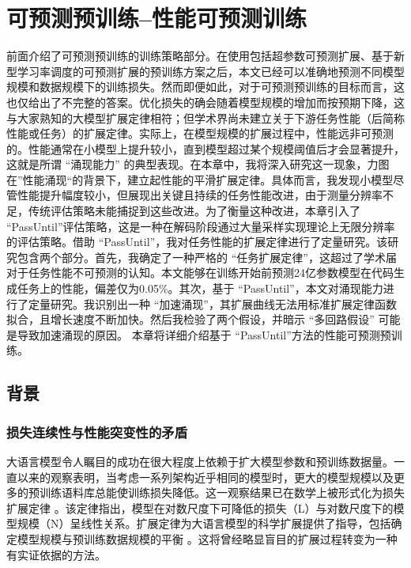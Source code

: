 


\chapter{可预测预训练--性能可预测训练}

前面介绍了可预测预训练的训练策略部分。在使用包括超参数可预测扩展、基于新型学习率调度的可预测扩展的预训练方案之后，本文已经可以准确地预测不同模型规模和数据规模下的训练损失。然而即便如此，对于可预测预训练的目标而言，这也仅给出了不完整的答案。优化损失的确会随着模型规模的增加而按预期下降，这与大家熟知的大模型扩展定律相符；但学术界尚未建立关于下游任务性能（后简称性能或任务）的扩展定律。实际上，在模型规模的扩展过程中，性能远非可预测的。性能通常在小模型上提升较小，直到模型超过某个规模阈值后才会显著提升，这就是所谓 “涌现能力” 的典型表现。在本章中，我将深入研究这一现象，力图在”性能涌现“的背景下，建立起性能的平滑扩展定律。具体而言，我发现小模型尽管性能提升幅度较小，但展现出关键且持续的任务性能改进，由于测量分辨率不足，传统评估策略未能捕捉到这些改进。为了衡量这种改进，本章引入了 “PassUntil”评估策略，这是一种在解码阶段通过大量采样实现理论上无限分辨率的评估策略。借助 “PassUntil”，我对任务性能的扩展定律进行了定量研究。该研究包含两个部分。首先，我确定了一种严格的 “任务扩展定律”，这超过了学术届对于任务性能不可预测的认知。本文能够在训练开始前预测24亿参数模型在代码生成任务上的性能，偏差仅为0.05\%。其次，基于 “PassUntil”，本文对涌现能力进行了定量研究。我识别出一种 “加速涌现”，其扩展曲线无法用标准扩展定律函数拟合，且增长速度不断加快。然后我检验了两个假设，并暗示 “多回路假设” 可能是导致加速涌现的原因。 本章将详细介绍基于 “PassUntil”方法的性能可预测预训练。

\section{背景}
\subsection{损失连续性与性能突变性的矛盾}

大语言模型令人瞩目的成功在很大程度上依赖于扩大模型参数和预训练数据量。一直以来的观察表明，当考虑一系列架构近乎相同的模型时，更大的模型规模以及更多的预训练语料库总能使训练损失降低。这一观察结果已在数学上被形式化为损失扩展定律 \citep{kaplan2020scaling, henighan2020scaling}。该定律指出，模型在对数尺度下可降低的损失（L）与对数尺度下的模型规模（N）呈线性关系。扩展定律为大语言模型的科学扩展提供了指导，包括确定模型规模与预训练数据规模的平衡 \citep{hoffmann2022training, muennighoff2023scaling}。这将曾经略显盲目的扩展过程转变为一种有实证依据的方法。

